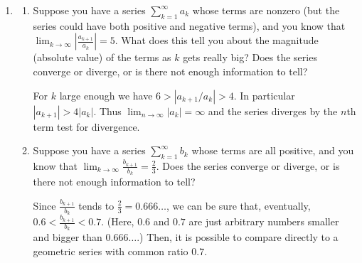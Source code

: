 \documentclass[main]{subfiles}
\begin{document}
\begin{enumerate}
  \item 
  \begin{enumerate}
    \item

    
    \begin{problem}[1in]
    Suppose you have a series $\displaystyle \sum_{k=1}^\infty a_k$ whose
    terms are nonzero (but the series could have both positive and
    negative terms), and you know that $\displaystyle \lim_{k \to \infty}
    \left| \frac{a_{k+1}}{a_k} \right| = 5$.  What does this tell you
    about the magnitude (absolute value) of the terms as $k$ gets really
    big?  Does the series converge or diverge, or is there not enough
    information to tell?  
    \end{problem}

    \begin{solution}
    For $k$ large enough we have $6>|a_{k+1}/a_k| > 4$. In particular $|a_{k+1}| > 4 |a_k|$. Thus $\lim_{n \to \infty} |a_k| = \infty$ and the series diverges by the $n$th term test for divergence.
    \end{solution}

    \item

    
    \begin{problem}[1in]
    Suppose you have a series $\displaystyle \sum_{k=1}^\infty b_k$
    whose terms are all positive, and you know that $\displaystyle
    \lim_{k \to \infty} \frac{b_{k+1}}{b_k} = \frac{2}{3}$.  Does the
    series converge or diverge, or is there not enough information to
    tell? 
    \end{problem}

    \begin{solution}
    Since $\frac{b_{k+1}}{b_k}$ tends to $\frac{2}{3} = 0.666\ldots$, we can be sure that, eventually, $0.6 <
    \frac{b_{k+1}}{b_k} < 0.7$.  (Here, $0.6$ and $0.7$ are just
    arbitrary numbers smaller and bigger than $0.666\ldots$.)  Then, it
    is possible to compare directly to a geometric series with common
    ratio $0.7$.
    \end{solution}


\end{enumerate}
\end{enumerate}
\end{document}
